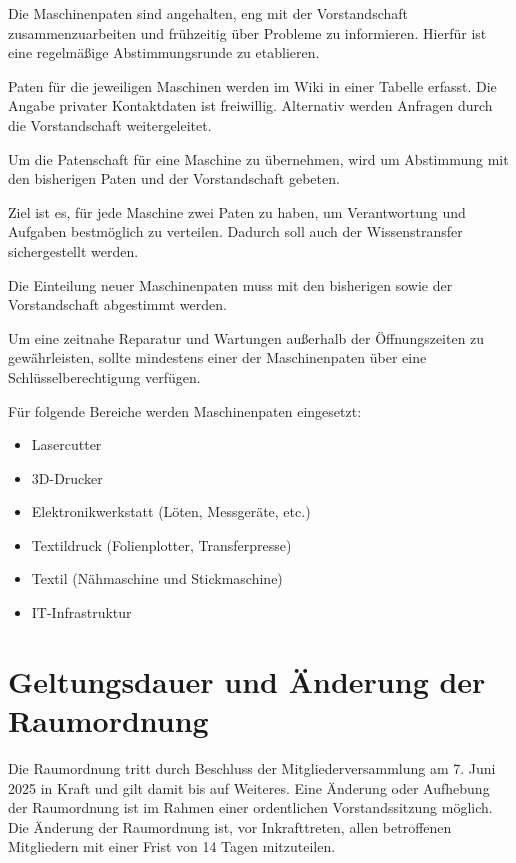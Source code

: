 Die Maschinenpaten sind angehalten, eng mit der Vorstandschaft zusammenzuarbeiten und frühzeitig über Probleme zu informieren. Hierfür ist eine regelmäßige Abstimmungsrunde zu etablieren.

Paten für die jeweiligen Maschinen werden im Wiki in einer Tabelle erfasst. Die Angabe privater Kontaktdaten ist freiwillig. Alternativ werden Anfragen durch die Vorstandschaft weitergeleitet.

Um die Patenschaft für eine Maschine zu übernehmen, wird um Abstimmung mit den bisherigen Paten und der Vorstandschaft gebeten.

Ziel ist es, für jede Maschine zwei Paten zu haben, um Verantwortung und Aufgaben bestmöglich zu verteilen. Dadurch soll auch der Wissenstransfer sichergestellt werden.

Die Einteilung neuer Maschinenpaten muss mit den bisherigen sowie der Vorstandschaft abgestimmt werden.

Um eine zeitnahe Reparatur und Wartungen außerhalb der Öffnungszeiten zu gewährleisten, sollte mindestens einer der Maschinenpaten über eine Schlüsselberechtigung verfügen.

Für folgende Bereiche werden Maschinenpaten eingesetzt:
\begin{itemize}
  \item Lasercutter 
  \item 3D-Drucker
  \item Elektronikwerkstatt (Löten, Messgeräte, etc.)
  \item Textildruck (Folienplotter, Transferpresse)
  \item Textil (Nähmaschine und Stickmaschine)
  \item IT-Infrastruktur
\end{itemize}


\section{Geltungsdauer und Änderung der Raumordnung}
Die Raumordnung tritt durch Beschluss der Mitgliederversammlung am 7. Juni 2025 in Kraft und gilt damit bis auf Weiteres. Eine Änderung oder Aufhebung der Raumordnung ist im Rahmen einer ordentlichen Vorstandssitzung möglich. Die Änderung der Raumordnung ist, vor Inkrafttreten, allen betroffenen Mitgliedern mit einer Frist von 14 Tagen mitzuteilen.


